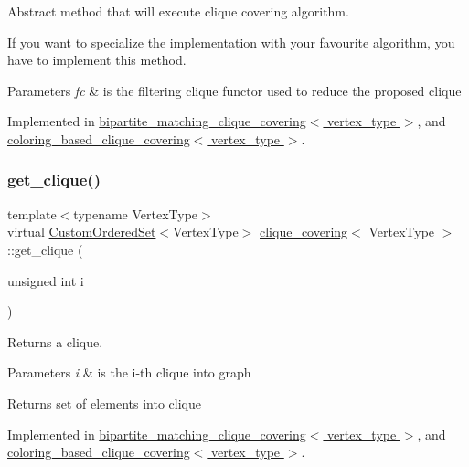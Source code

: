 Abstract method that will execute clique covering algorithm. 

If you want to specialize the implementation with your favourite algorithm, you have to implement this method. 
\begin{DoxyParams}{Parameters}
{\em fc} & is the filtering clique functor used to reduce the proposed clique \\
\hline
\end{DoxyParams}


Implemented in \hyperlink{classbipartite__matching__clique__covering_aa4caf6d3d3f37c7157f80c2e4d145a4e}{bipartite\+\_\+matching\+\_\+clique\+\_\+covering$<$ vertex\+\_\+type $>$}, and \hyperlink{classcoloring__based__clique__covering_aeb77d6c0bdc7d04c9b1dcff7baed450b}{coloring\+\_\+based\+\_\+clique\+\_\+covering$<$ vertex\+\_\+type $>$}.

\mbox{\label{classclique__covering_ab0ac09e6c1be800358fb327728a07146}} 
\subsubsection{\texorpdfstring{get\+\_\+clique()}{get\_clique()}}
{\footnotesize\ttfamily template$<$typename Vertex\+Type$>$ \\
virtual \hyperlink{classCustomOrderedSet}{Custom\+Ordered\+Set}$<$Vertex\+Type$>$ \hyperlink{classclique__covering}{clique\+\_\+covering}$<$ Vertex\+Type $>$\+::get\+\_\+clique (\begin{DoxyParamCaption}\item[{unsigned int}]{i }\end{DoxyParamCaption})\hspace{0.3cm}{\ttfamily [pure virtual]}}



Returns a clique. 


\begin{DoxyParams}{Parameters}
{\em i} & is the i-\/th clique into graph \\
\hline
\end{DoxyParams}
\begin{DoxyReturn}{Returns}
set of elements into clique 
\end{DoxyReturn}


Implemented in \hyperlink{classbipartite__matching__clique__covering_ad44a38f1e0c81a9e5b534c729eaf7ea7}{bipartite\+\_\+matching\+\_\+clique\+\_\+covering$<$ vertex\+\_\+type $>$}, and \hyperlink{classcoloring__based__clique__covering_a2323722479808dd83c1df1382355e603}{coloring\+\_\+based\+\_\+clique\+\_\+covering$<$ vertex\+\_\+type $>$}.


